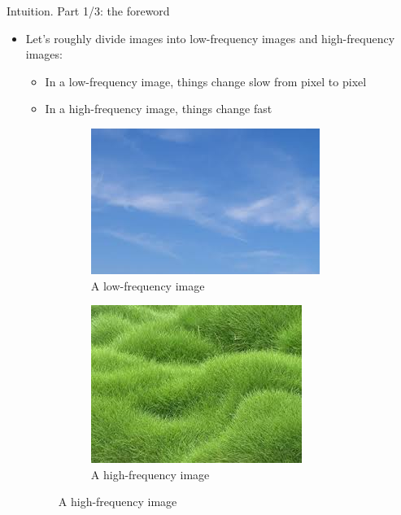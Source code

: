 \documentclass[handout, 10pt]{beamer}
\begin{document}
\begin{frame}{Intuition. Part 1/3: the foreword}
\begin{itemize}
    \item\pause Let's roughly divide images into low-frequency images and high-frequency images:
    \begin{itemize}
        \item\pause In a low-frequency image, things change slow from pixel to pixel
        \item\pause In a high-frequency image, things change fast
    \end{itemize}
    \begin{figure}
        \begin{subfigure}{0.45\textwidth}
            \centering
            \includegraphics[width=0.9\linewidth]{images/sky}
            \caption{A low-frequency image}
        \end{subfigure}
        \begin{subfigure}{0.45\textwidth}
            \centering
            \includegraphics[width=0.9\linewidth]{images/grass}
            \caption{A high-frequency image}
        \end{subfigure}
    \end{figure}
\end{itemize}
\end{frame}
\end{document}
